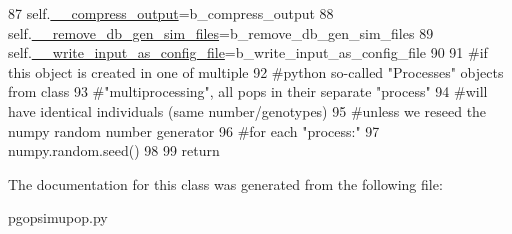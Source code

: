 \begin{DoxyCode}
87         self.\hyperlink{classnegui_1_1pgopsimupop_1_1PGOpSimuPop_acccf36393e66057c8026cba0557d3fb8}{\_\_compress\_output}=b\_compress\_output
88         self.\hyperlink{classnegui_1_1pgopsimupop_1_1PGOpSimuPop_a5a64b272404e6113dd1c7ba70235c366}{\_\_remove\_db\_gen\_sim\_files}=b\_remove\_db\_gen\_sim\_files
89         self.\hyperlink{classnegui_1_1pgopsimupop_1_1PGOpSimuPop_a9a27655cf00df0e11603e221c314c0a9}{\_\_write\_input\_as\_config\_file}=b\_write\_input\_as\_config\_file
90 
91         \textcolor{comment}{#if this object is created in one of multiple}
92         \textcolor{comment}{#python so-called "Processes" objects from class}
93         \textcolor{comment}{#"multiprocessing", all pops in their separate "process"}
94         \textcolor{comment}{#will have identical individuals (same number/genotypes) }
95         \textcolor{comment}{#unless we reseed the numpy random number generator }
96         \textcolor{comment}{#for each "process:"}
97         numpy.random.seed()
98         
99         \textcolor{keywordflow}{return}
\end{DoxyCode}


The documentation for this class was generated from the following file\+:\begin{DoxyCompactItemize}
\item 
pgopsimupop.\+py\end{DoxyCompactItemize}
